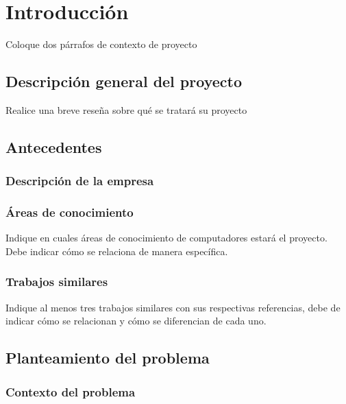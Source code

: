 
\chapter{Introducción}
\label{chp:intro}

Coloque dos párrafos de contexto de proyecto

\section{Descripción general del proyecto}
Realice una breve reseña sobre qué se tratará su proyecto

\section{Antecedentes}



\subsection{Descripción de la empresa}

\subsection{Áreas de conocimiento}
Indique en cuales áreas de conocimiento de computadores estará el proyecto. Debe indicar cómo se relaciona de manera específica.

\subsection{Trabajos similares}

Indique al menos tres trabajos similares con sus respectivas referencias, debe de indicar cómo se relacionan y cómo se diferencian de cada uno.

\section{Planteamiento del problema}



\subsection{Contexto del problema}

